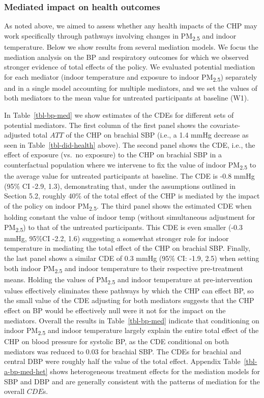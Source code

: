 \documentclass[
  letterpaper,
  DIV=11,
  numbers=noendperiod]{scrartcl}
\begin{document}
\subsubsection{Mediated impact on health
outcomes}\label{mediated-impact-on-health-outcomes}

As noted above, we aimed to assess whether any health impacts of the CHP
may work specifically through pathways involving changes in
PM\textsubscript{2.5} and indoor temperature. Below we show results from
several mediation models. We focus the mediation analysis on the BP and
respiratory outcomes for which we observed stronger evidence of total
effects of the policy. We evaluated potential mediation for each
mediator (indoor temperature and exposure to indoor
PM\textsubscript{2.5}) separately and in a single model accounting for
multiple mediators, and we set the values of both mediators to the mean
value for untreated participants at baseline (W1).

In Table~\ref{tbl-bp-med} we show estimates of the CDEs for different
sets of potential mediators.  The first column of the
first panel shows the covariate-adjusted total \(ATT\) of the CHP on
brachial SBP (i.e., a 1.4 mmHg decrease as seen in
Table~\ref{tbl-did-health} above). The second panel shows the CDE, i.e.,
the effect of exposure (vs.~no exposure) to the CHP on brachial SBP in a
counterfactual population where we intervene to fix the value of indoor
PM\textsubscript{2.5} to the average value for untreated participants at
baseline. The CDE is -0.8 mmHg (95\% CI -2.9, 1.3), demonstrating that,
under the assumptions outlined in Section 5.2, roughly 40\% of the total
effect of the CHP is mediated by the impact of the policy on indoor
PM\textsubscript{2.5}. The third panel shows the estimated CDE when
holding constant the value of indoor temp (without simultaneous
adjustment for PM\textsubscript{2.5}) to that of the untreated
participants. This CDE is even smaller (-0.3 mmHg, 95\%CI -2.2, 1.6)
suggesting a somewhat stronger role for indoor temperature in mediating
the total effect of the CHP on brachial SBP. Finally, the last panel
shows a similar CDE of 0.3 mmHg (95\% CI: -1.9, 2.5) when setting both
indoor PM\textsubscript{2.5} and indoor temperature to their respective
pre-treatment means. Holding the values of PM\textsubscript{2.5} and
indoor temperature at pre-intervention values effectively eliminates
these pathways by which the CHP can effect BP, so the small value of the
CDE adjusting for both mediators suggests that the CHP effect on BP
would be effectively null were it not for the impact on the mediators.
Overall the results in Table~\ref{tbl-bp-med} indicate that conditioning
on indoor PM\textsubscript{2.5} and indoor temperature largely explain
the entire total effect of the CHP on blood pressure for systolic BP, as
the CDE conditional on both mediators was reduced to 0.03 for brachial
SBP. The CDEs for brachial and central DBP were roughly half the value
of the total effect. Appendix Table~\ref{tbl-a-bp-med-het} shows
heterogeneous treatment effects for the mediation models for SBP and DBP
and are generally consistent with the patterns of mediation for the
overall \(CDE\)s.
\end{document}
